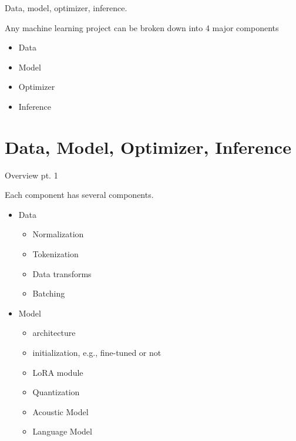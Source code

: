 \documentclass{beamer}
\begin{document}
\begin{frame}{Data, model, optimizer, inference.}

  Any machine learning project can be broken down into 4 major components
  \begin{itemize}
  \item
    Data
  \item
    Model
  \item
    Optimizer
  \item
    Inference
  \end{itemize}
\end{frame}


\section{Data, Model, Optimizer, Inference}

\begin{frame}{Overview pt. 1}

  Each component has several components.
  \begin{itemize}
  \item 
    Data
    \begin{itemize}
    \item Normalization
    \item Tokenization
    \item Data transforms
    \item Batching
    \end{itemize}
  \item 
    Model
    \begin{itemize}
    \item architecture
    \item initialization, e.g., fine-tuned or not
    \item LoRA module
    \item Quantization
    \item Acoustic Model
    \item Language Model
    \end{itemize}
  \end{itemize}

\end{frame}
\end{document}
